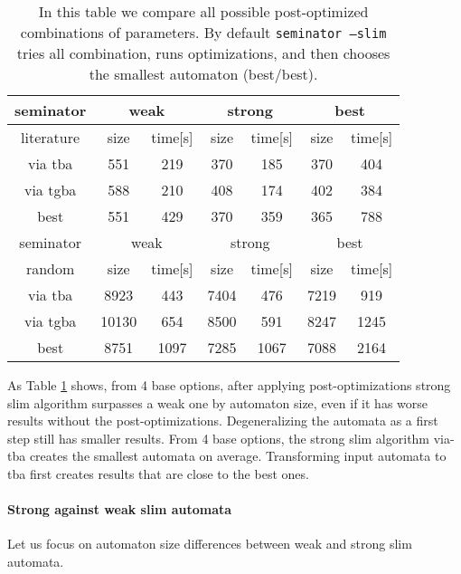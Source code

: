 \documentclass[
	digital,
nolof, nolot
]{fithesis3}
\begin{document}
	\begin{table}[ht]
		
		\centering
		\caption{In this table we compare all possible post-optimized combinations of parameters. By default \texttt{seminator --slim} tries all combination, runs optimizations, and then chooses the smallest automaton (best/best). }
		\label{table:seminator:optimized}
		\begin{tabular}{ |c||c|c|c|c|c|c| } 
			\hline
			seminator&\multicolumn{2}{c|}{weak}&\multicolumn{2}{c|}{strong}&\multicolumn{2}{c|}{best} \\
			\hline
			literature&size&time[s]&size&time[s]&size&time[s]\\
			\hhline{|=======|}
			
			via tba&551&219& 370 &185& 370&404\\
			\hline
			via tgba&588&210& 408&174& 402&384\\ 
			\hline
			best&551&429& 370&359& 365&788 \\ 
			\hline
			
			
			\hline
			seminator&\multicolumn{2}{c|}{weak}&\multicolumn{2}{c|}{strong}&\multicolumn{2}{c|}{best} \\
			\hline
			random&size&time[s]&size&time[s]&size&time[s]\\
			\hhline{|=======|}
			via tba&8923&443& 7404 &476& 7219&919\\
			\hline
			via tgba&10130&654& 8500&591& 8247&1245\\ 
			\hline
			best&8751&1097& 7285&1067& 7088&2164 \\ 
			\hline
		\end{tabular}
	\end{table}

	
	As Table \ref{table:seminator:optimized} shows, from 4 base options, after applying post-optimizations strong slim algorithm surpasses a weak one by automaton size, even if it has worse results without the post-optimizations.
	Degeneralizing the automata as a first step still has smaller results.
	From 4 base options, the strong slim algorithm via-tba creates the smallest automata on average.
	Transforming input automata to tba first creates results that are close to the best ones. 
	
	
	\paragraph{Strong against weak slim automata}
	Let us focus on automaton size differences between weak and strong slim automata.
	
\end{document}
